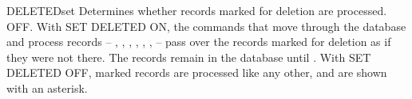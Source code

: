 \begin{XbaseEntry}{DELETED}{set}
Determines whether records marked for deletion are processed.
\Syntax
{}
\Defaults
OFF.
\Usage
With SET DELETED ON, the commands that move through the database and process
records -- , , , ,
, ,  -- pass over the records marked for
deletion as if they were not there.  The records remain in the database until
.  With SET DELETED OFF, marked records are processed like any
other, and are shown with an asterisk.
\Examples
{}
\end{XbaseEntry}

